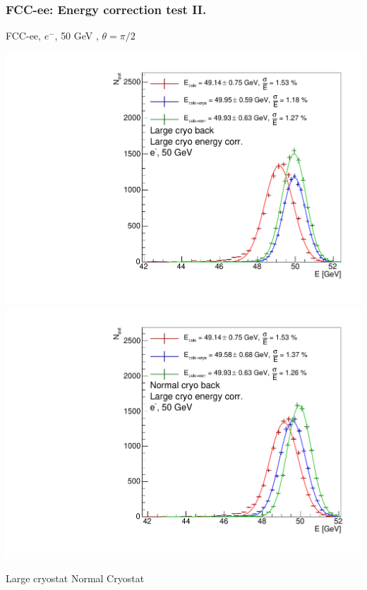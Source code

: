 \documentclass{beamer}
\newcommand{\redtext}[1]{%
  \textcolor{myRed}{#1}
}
\begin{document}
\begin{frame}
  \frametitle{FCC-ee: Energy correction test II.}

  \centering
  FCC-ee, $e^{-}$, \redtext{50 GeV}, $\theta = \pi/2$ \\[1.5ex]
  \begin{adjustwidth}{-9mm}{-9mm}
    \includegraphics[width=0.49\linewidth]{figures/energy_corr/large_cryo__large_cryo_corr/sums_large_cryo__large_cryo_corr_90deg_50gev.pdf}
    \includegraphics[width=0.49\linewidth]{figures/energy_corr/normal_cryo__large_cryo_corr/sums_normal_cryo__large_cryo_corr_90deg_50gev.pdf}
  \end{adjustwidth}
  Large cryostat \hspace{4cm} Normal Cryostat
\end{frame}
\end{document}
